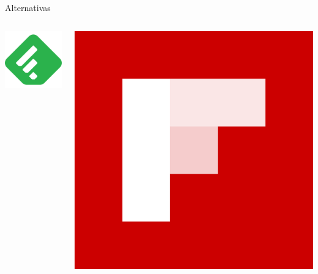 \documentclass[12pt]{beamer}
\begin{document}
		\begin{frame}{Alternativas}
			\begin{columns}[onlytextwidth]
				\begin{column}{0.3\textwidth}
					\includegraphics[width=\textwidth,height=0.8\textheight,keepaspectratio]{img/alternativas/feedly_logo}
				\end{column}
				\begin{column}{0.3\textwidth}
					\includegraphics[width=\textwidth,height=0.8\textheight,keepaspectratio]{img/alternativas/flipboard_logo}

\end{column}
\end{columns}
\end{frame}
\end{document}

